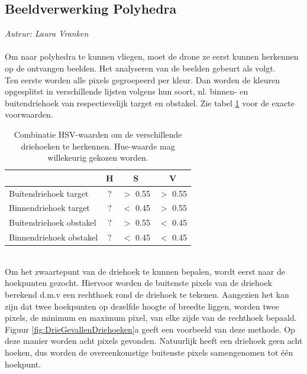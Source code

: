 \subsection{Beeldverwerking Polyhedra}
{\em Auteur: Laura Vranken}
\\
\\
\noindent
Om naar polyhedra te kunnen vliegen, moet de drone ze eerst kunnen herkennen op de ontvangen beelden. Het analyseren van de beelden gebeurt als volgt. 
\\
Ten eerste worden alle pixels gegroepeerd per kleur. Dan worden de kleuren opgesplitst in verschillende lijsten volgens hun soort, nl. binnen- en buitendriehoek van respectievelijk target en obstakel. Zie tabel \ref{table: HSVwaarden} voor de exacte voorwaarden.
\begin{table}[h]
	\centering
\begin{tabular}{ l | c | c | c }
	 & H & S & V\\\hline
	Buitendriehoek target & ? & \(>\) 0.55 & \(>\) 0.55 \\
	Binnendriehoek target & ? & \(<\) 0.45 & \(>\) 0.55 \\
	Buitendriehoek obstakel & ? & \(>\) 0.55 & \(<\) 0.45 \\
	Binnendriehoek obstakel & ? & \(<\) 0.45 & \(<\) 0.45\\
\end{tabular}
\caption{\label{table: HSVwaarden}Combinatie HSV-waarden om de verschillende driehoeken te herkennen. Hue-waarde mag willekeurig gekozen worden.}
\end{table}
\\
Om het zwaartepunt van de driehoek te kunnen bepalen, wordt eerst naar de hoekpunten gezocht. Hiervoor worden de buitenste pixels van de driehoek berekend d.m.v een rechthoek rond de driehoek te tekenen. Aangezien het kan zijn dat twee hoekpunten op dezelfde hoogte of breedte liggen, worden twee pixels, de minimum en maximum pixel, van elke zijde van de rechthoek bepaald. Figuur \ref{fig:DrieGevallenDriehoeken}a geeft een voorbeeld van deze methode. Op deze manier worden acht pixels gevonden. Natuurlijk heeft een driehoek geen acht hoeken, dus worden de overeenkomstige buitenste pixels samengenomen tot één hoekpunt. 
